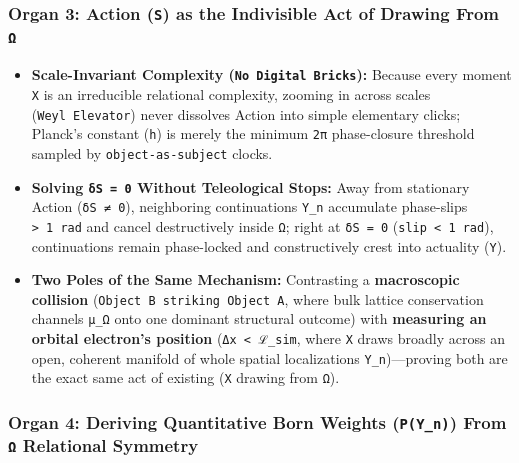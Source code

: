 \documentclass[
]{article}
\begin{document}
\subsubsection{\texorpdfstring{Organ 3: Action (\texttt{S}) as the
Indivisible Act of Drawing From
\texttt{Ω}}{Organ 3: Action (S) as the Indivisible Act of Drawing From Ω}}\label{organ-3-action-s-as-the-indivisible-act-of-drawing-from-ux3c9}

\begin{itemize}
\item
  \textbf{Scale-Invariant Complexity (\texttt{No~Digital~Bricks}):}
  Because every moment \texttt{X} is an irreducible relational
  complexity, zooming in across scales (\texttt{Weyl~Elevator}) never
  dissolves Action into simple elementary clicks; Planck's constant
  (\texttt{h}) is merely the minimum \texttt{2π} phase-closure threshold
  sampled by \texttt{object-as-subject} clocks.
\item
  \textbf{Solving \texttt{δS~=~0} Without Teleological Stops:} Away from
  stationary Action (\texttt{δS~≠~0}), neighboring continuations
  \texttt{\textquotesingle{}Y\_n} accumulate phase-slips
  \texttt{\textgreater{}~1~rad} and cancel destructively inside
  \texttt{Ω}; right at \texttt{δS~=~0}
  (\texttt{slip~\textless{}~1~rad}), continuations remain phase-locked
  and constructively crest into actuality (\texttt{Y}).
\item
  \textbf{Two Poles of the Same Mechanism:} Contrasting a
  \textbf{macroscopic collision} (\texttt{Object~B~striking~Object~A},
  where bulk lattice conservation channels \texttt{μ\_Ω} onto one
  dominant structural outcome) with \textbf{measuring an orbital
  electron's position} (\texttt{Δx~\textless{}~ℒ\_sim}, where \texttt{X}
  draws broadly across an open, coherent manifold of whole spatial
  localizations \texttt{\textquotesingle{}Y\_n})---proving both are the
  exact same act of existing (\texttt{X} drawing from \texttt{Ω}).
\end{itemize}

\subsubsection{\texorpdfstring{Organ 4: Deriving Quantitative Born
Weights (\texttt{P(\textquotesingle{}Y\_n)}) From \texttt{Ω} Relational
Symmetry}{Organ 4: Deriving Quantitative Born Weights (P(\textquotesingle Y\_n)) From Ω Relational Symmetry}}\label{organ-4-deriving-quantitative-born-weights-py_n-from-ux3c9-relational-symmetry}
\end{document}
